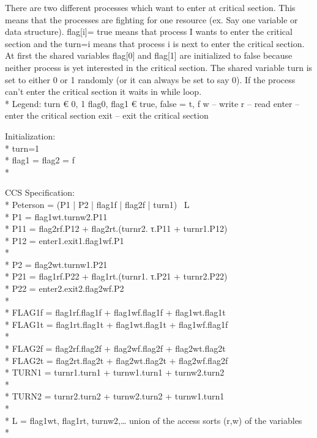 There are two different processes which want to enter at critical section. 
This means that the processes are fighting for one resource (ex. Say one variable or data structure). 
flag[i]= true means that process I wants to enter the critical section and the turn=i means that process i is next to enter the critical section.
 At first the shared variables flag[0] and flag[1] are initialized to false because neither process is yet interested in the critical section. 
 The shared variable turn is set to either 0 or 1 randomly (or it can always be set to say 0). 
 If the process can’t enter the critical section it waits in while loop.
\\*
Legend:
turn € {0, 1}
flag0, flag1 € {true, false} = {t, f}
w – write
r – read
enter – enter the critical section
exit – exit the critical section

Initialization:\\*
turn=1\\*
flag1 = flag2 = f\\*

CCS Specification:\\*
Peterson = (P1 | P2 | flag1f | flag2f | turn1) \ L\\*
P1 = flag1wt.turnw2.P11\\*
P11 = flag2rf.P12 + flag2rt.(turnr2. τ.P11 + turnr1.P12)\\*
P12 = enter1.exit1.flag1wf.P1\\*\\*
P2 = flag2wt.turnw1.P21\\*
P21 = flag1rf.P22 + flag1rt.(turnr1. τ.P21 + turnr2.P22)\\*
P22 = enter2.exit2.flag2wf.P2\\*\\*
FLAG1f = flag1rf.flag1f + flag1wf.flag1f + flag1wt.flag1t\\*
FLAG1t = flag1rt.flag1t + flag1wt.flag1t + flag1wf.flag1f\\*\\*
FLAG2f = flag2rf.flag2f + flag2wf.flag2f + flag2wt.flag2t\\*
FLAG2t = flag2rt.flag2t + flag2wt.flag2t + flag2wf.flag2f\\*
TURN1 = turnr1.turn1 + turnw1.turn1 + turnw2.turn2\\*\\*
TURN2 = turnr2.turn2 + turnw2.turn2 + turnw1.turn1\\*\\*
L = { flag1wt, flag1rt, turnw2,… union of the access sorts (r,w) of the
variables }\\*

